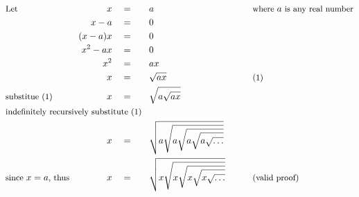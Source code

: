 \begin{alignat*}{7}
&\small\text{Let}\normalsize&x\quad&=\quad&&a\qquad&&\small\text{where }a{\text{ is any real number}}\\
&\,&x-a\quad&=&&0\\
&\,&(x-a)x\quad&=&&0\\
&\,&x^2-ax\quad&=&&0\\
&\,&x^2\quad&=&&ax\\
&\,&x\quad&=&&\sqrt{ax}&&\small\text{(1)}\\
&\small\text{substitue (1)}\normalsize&x\quad&=&&\sqrt{a\sqrt{ax}}\\
&\rlap{\small\text{indefinitely recursively substitute (1)}\normalsize}\\
&\,&x\quad&=&&\sqrt{a\sqrt{a\sqrt{a\sqrt{a\sqrt{\ldots}}}}}\\
&\small\text{since }x=a\text{, thus}\normalsize&x\quad&=&&\sqrt{x\sqrt{x\sqrt{x\sqrt{x\sqrt{\ldots}}}}}\qquad&&\small\text{(valid proof)}
\end{alignat*}
